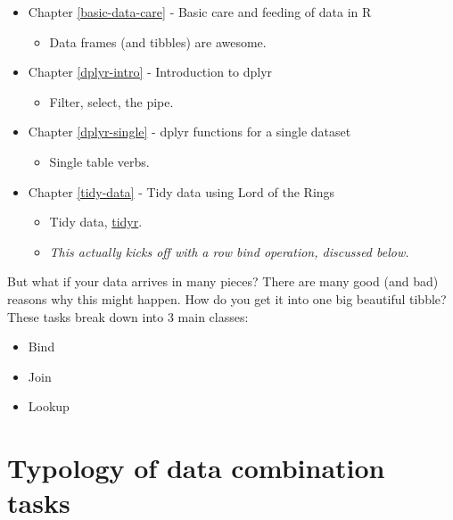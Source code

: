 \documentclass[
]{book}
\providecommand{\tightlist}{%
  \setlength{\itemsep}{0pt}\setlength{\parskip}{0pt}}
\begin{document}
\begin{itemize}
\tightlist
\item
  Chapter \ref{basic-data-care} - Basic care and feeding of data in R

  \begin{itemize}
  \tightlist
  \item
    Data frames (and tibbles) are awesome.
  \end{itemize}
\item
  Chapter \ref{dplyr-intro} - Introduction to dplyr

  \begin{itemize}
  \tightlist
  \item
    Filter, select, the pipe.
  \end{itemize}
\item
  Chapter \ref{dplyr-single} - dplyr functions for a single dataset

  \begin{itemize}
  \tightlist
  \item
    Single table verbs.
  \end{itemize}
\item
  Chapter \ref{tidy-data} - Tidy data using Lord of the Rings

  \begin{itemize}
  \tightlist
  \item
    Tidy data, \href{https://tidyr.tidyverse.org}{tidyr}.
  \item
    \emph{This actually kicks off with a row bind operation, discussed below.}
  \end{itemize}
\end{itemize}

But what if your data arrives in many pieces? There are many good (and bad) reasons why this might happen. How do you get it into one big beautiful tibble? These tasks break down into 3 main classes:

\begin{itemize}
\tightlist
\item
  Bind
\item
  Join
\item
  Lookup
\end{itemize}

\hypertarget{typology-of-data-combination-tasks}{%
\section{Typology of data combination tasks}\label{typology-of-data-combination-tasks}}
\end{document}
